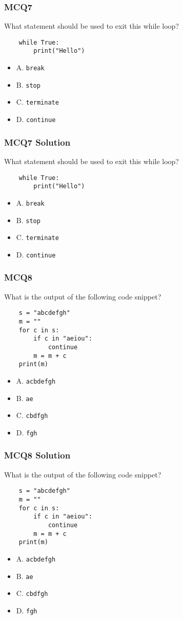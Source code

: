 \documentclass{beamer}
\begin{document}
\begin{frame}[fragile]
    \frametitle{MCQ7}
    What statement should be used to exit this while loop?
    \begin{verbatim}
    while True:
        print("Hello")
    \end{verbatim}
    \begin{itemize}
        \item A. \texttt{break}
        \item B. \texttt{stop}
        \item C. \texttt{terminate}
        \item D. \texttt{continue}
    \end{itemize}
\end{frame}
\begin{frame}[fragile]
    \frametitle{MCQ7 Solution}
    What statement should be used to exit this while loop?
    \begin{verbatim}
    while True:
        print("Hello")
    \end{verbatim}
    \begin{itemize}
        \item \alert{A. \texttt{break}}
        \item B. \texttt{stop}
        \item C. \texttt{terminate}
        \item D. \texttt{continue}
    \end{itemize}
\end{frame}

\begin{frame}[fragile]
    \frametitle{MCQ8}
    What is the output of the following code snippet?
    \begin{verbatim}
    s = "abcdefgh"
    m = ""
    for c in s:
        if c in "aeiou":
            continue
        m = m + c
    print(m)
    \end{verbatim}
    \begin{itemize}
        \item A. \texttt{acbdefgh}
        \item B. \texttt{ae}
        \item C. \texttt{cbdfgh}
        \item D. \texttt{fgh}
    \end{itemize}
\end{frame}
\begin{frame}[fragile]
    \frametitle{MCQ8 Solution}
    What is the output of the following code snippet?
    \begin{verbatim}
    s = "abcdefgh"
    m = ""
    for c in s:
        if c in "aeiou":
            continue
        m = m + c
    print(m)
    \end{verbatim}
    \begin{itemize}
        \item A. \texttt{acbdefgh}
        \item \alert{B. \texttt{ae}}
        \item C. \texttt{cbdfgh}
        \item D. \texttt{fgh}
    \end{itemize}
\end{frame}
\end{document}
